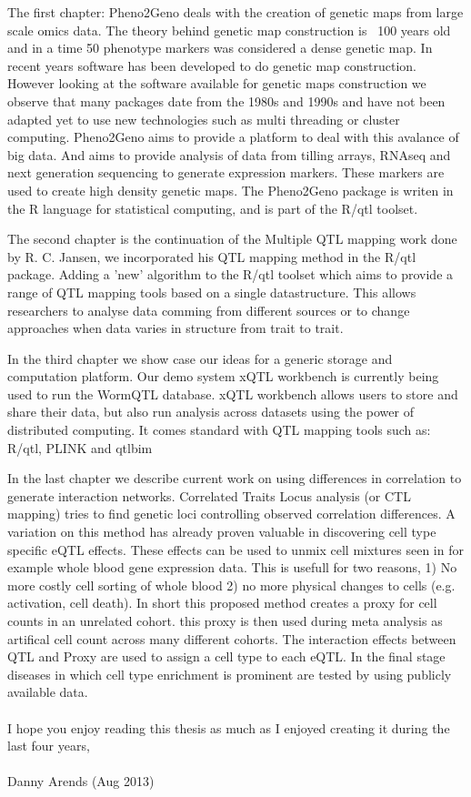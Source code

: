 The first chapter: Pheno2Geno deals with the creation of genetic maps from large scale omics data. 
The theory behind genetic map construction is ~100 years old and in a time 50 phenotype markers was 
considered a dense genetic map. In recent years software has been developed to do genetic map 
construction. However looking at the software available for genetic maps construction we observe 
that many packages date from the 1980s and 1990s and have not been adapted yet to use new 
technologies such as multi threading or cluster computing. Pheno2Geno aims to provide a platform to 
deal with this avalance of big data. And aims to provide analysis of data from tilling arrays, 
RNAseq and next generation sequencing to generate expression markers. These markers are used to 
create high density genetic maps. The Pheno2Geno package is writen in the R language for statistical 
computing, and is part of the R/qtl toolset.

The second chapter is the continuation of the Multiple QTL mapping work done by R. C. Jansen, we 
incorporated his QTL mapping method in the R/qtl package. Adding a 'new' algorithm to the R/qtl 
toolset which aims to provide a range of QTL mapping tools based on a single datastructure. 
This allows researchers to analyse data comming from different sources or to change approaches when 
data varies in structure from trait to trait.

In the third chapter we show case our ideas for a generic storage and computation platform. Our demo 
system xQTL workbench is currently being used to run the WormQTL database. xQTL workbench allows 
users to store and share their data, but also run analysis across datasets using the power of 
distributed computing. It comes standard with  QTL mapping tools such as: R/qtl, PLINK and qtlbim

In the last chapter we describe current work on using differences in correlation to generate 
interaction networks. Correlated Traits Locus analysis (or CTL mapping) tries to find genetic 
loci controlling observed correlation differences. A variation on this method has already proven 
valuable in discovering cell type specific eQTL effects. These effects can be used to unmix cell 
mixtures seen in for example whole blood gene expression data. This is usefull for two reasons, 
1) No more costly cell sorting of whole blood 2) no more physical changes to cells (e.g. activation, 
cell death). In short this proposed method creates a proxy for cell counts in an unrelated cohort. 
this proxy is then used during meta analysis as artifical cell count across many different cohorts.
The interaction effects between QTL and Proxy are used to assign a cell type to each eQTL. In the final 
stage diseases in which cell type enrichment is prominent are tested by using publicly available data.\\\\

I hope you enjoy reading this thesis as much as I enjoyed creating it during the last four years,\\\\

Danny Arends (Aug 2013)
